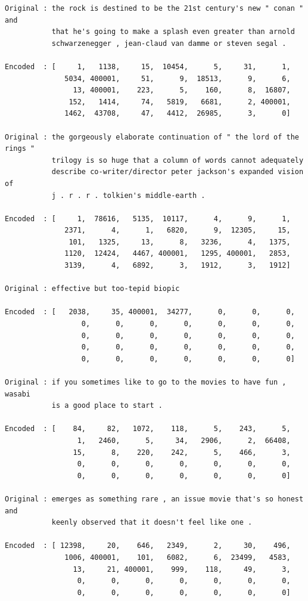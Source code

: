 \documentclass[11pt,a4paper]{article}
\begin{document}
\begin{verbatim}
Original : the rock is destined to be the 21st century's new " conan " and
           that he's going to make a splash even greater than arnold
           schwarzenegger , jean-claud van damme or steven segal .

Encoded  : [     1,   1138,     15,  10454,      5,     31,      1,
              5034, 400001,     51,      9,  18513,      9,      6,
                13, 400001,    223,      5,    160,      8,  16807,
               152,   1414,     74,   5819,   6681,      2, 400001,
              1462,  43708,     47,   4412,  26985,      3,      0]

Original : the gorgeously elaborate continuation of " the lord of the rings "
           trilogy is so huge that a column of words cannot adequately
           describe co-writer/director peter jackson's expanded vision of
           j . r . r . tolkien's middle-earth .

Encoded  : [     1,  78616,   5135,  10117,      4,      9,      1,
              2371,      4,      1,   6820,      9,  12305,     15,
               101,   1325,     13,      8,   3236,      4,   1375,
              1120,  12424,   4467, 400001,   1295, 400001,   2853,
              3139,      4,   6892,      3,   1912,      3,   1912]

Original : effective but too-tepid biopic

Encoded  : [   2038,     35, 400001,  34277,      0,      0,      0,
                  0,      0,      0,      0,      0,      0,      0,
                  0,      0,      0,      0,      0,      0,      0,
                  0,      0,      0,      0,      0,      0,      0,
                  0,      0,      0,      0,      0,      0,      0]

Original : if you sometimes like to go to the movies to have fun , wasabi
           is a good place to start .

Encoded  : [    84,     82,   1072,    118,      5,    243,      5,
                 1,   2460,      5,     34,   2906,      2,  66408,
                15,      8,    220,    242,      5,    466,      3,
                 0,      0,      0,      0,      0,      0,      0,
                 0,      0,      0,      0,      0,      0,      0]

Original : emerges as something rare , an issue movie that's so honest and
           keenly observed that it doesn't feel like one .

Encoded  : [ 12398,     20,    646,   2349,      2,     30,    496,
              1006, 400001,    101,   6082,      6,  23499,   4583,
                13,     21, 400001,    999,    118,     49,      3,
                 0,      0,      0,      0,      0,      0,      0,
                 0,      0,      0,      0,      0,      0,      0]

\end{verbatim}
\end{document}
